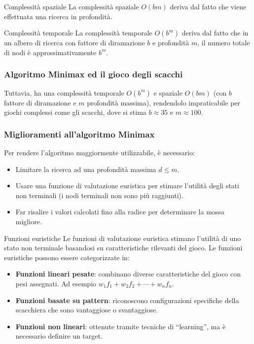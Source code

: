 \begin{nota}{Complessità spaziale} {}
La complessità spaziale $O(bm)$ deriva dal fatto che viene effettuata una
ricerca in profondità.
\end{nota}


\begin{nota}{Complessità temporale}{}
    La complessità temporale $O(b^m)$ deriva dal fatto che in un albero di
    ricerca con fattore di diramazione $b$ e profondità $m$, il numero totale
    di nodi è approssimativamente $b^m$.
\end{nota}

\subsubsection{Algoritmo Minimax ed il gioco degli scacchi}
Tuttavia, ha una complessità temporale $O(b^m)$ e spaziale $O(bm)$ (con $b$
fattore di diramazione e $m$ profondità massima), rendendolo impraticabile
per giochi complessi come gli scacchi, dove si stima $b \approx 35$ e
$m \approx 100$.

\subsubsection{Miglioramenti all'algoritmo Minimax}

Per rendere l'algoritmo maggiormente utilizzabile, è necessario:

\begin{itemize}
    \item Limitare la ricerca ad una profondità massima $d \le m$.
    \item Usare una funzione di valutazione euristica per stimare l'utilità
    degli stati non terminali (i nodi terminali non sono più raggiunti).
    \item Far risalire i valori calcolati fino alla radice per determinare
    la mossa migliore.
\end{itemize}

\begin{nota}{Funzioni euristiche}{}
Le funzioni di valutazione euristica stimano l'utilità di uno stato
non terminale basandosi su caratteristiche rilevanti del gioco.
Le funzioni euristiche possono essere categorizzate in:
\begin{itemize}
    \item \textbf{Funzioni lineari pesate}: combinano diverse caratteristiche
    del gioco con pesi assegnati. Ad esempio $w_{1}f_{1} + w_{2}f_{2} + \cdots + w_{n}f_{n}$.
    \item \textbf{Funzioni basate su pattern}: riconoscono configurazioni
    specifiche della scacchiera che sono vantaggiose o svantaggiose.
    \item \textbf{Funzioni non lineari}: ottenute tramite tecniche di
    ``learning'', ma è necessario definire un target.
\end{itemize}

\end{nota}

